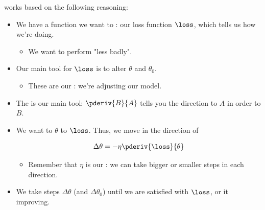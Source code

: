         \begin{concept}
             works based on the following reasoning:
        
            \begin{itemize}
                \item We have a function we want to : our loss function $\loss$, which tells us how  we're doing.
                    \begin{itemize}
                        \item We want to perform "less badly".
                    \end{itemize}
                    
                \boxdiv
                    
                \item Our main tool for  $\loss$ is to alter $\theta$ and $\theta_0$.
                    \begin{itemize}
                        \item These are our : we're adjusting our model.
                    \end{itemize}
                    
                
                    
                \item The  is our main tool: $\pderiv{B}{A}$ tells you the direction to  $A$ in order to  $B$.
                
                \boxdiv
                
                \item We want to  $\theta$ to  $\loss$. Thus, we move in the direction of 
                    
                    \begin{equation}
                        \Delta \theta = -\eta \pderiv{\loss}{\theta}
                    \end{equation}
                    
                    \begin{itemize}
                        \item Remember that $\eta$ is our : we can take bigger or smaller steps in each direction.
                    \end{itemize}
                    
                \boxdiv
                    
                \item We take steps $\Delta \theta$ (and $\Delta \theta_0$) until we are satisfied with $\loss$, or it  improving.
            \end{itemize}
            
        \end{concept}
        
